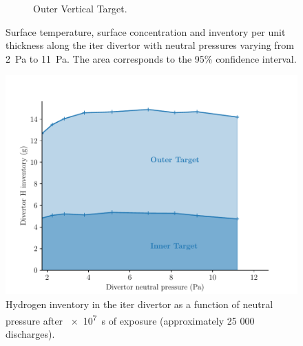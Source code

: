 \begin{figure}[h!]
\begin{subfigure}{0.58\linewidth}
        \caption{Outer Vertical Target.}
    \end{subfigure}
    \caption{Surface temperature, surface concentration and \gls{inventory} per unit thickness along the \gls{iter} \gls{divertor} with neutral pressures varying from \SI{2}{Pa} to \SI{11}{Pa}. The area corresponds to the 95\% confidence interval.}
\end{figure}


\begin{figure}[h]
    \centering
    \includegraphics[width=\linewidth]{Figures/Chapter4/ITER/inventory_vs_divertor_pressure.pdf}
    \caption{Hydrogen \gls{inventory} in the \gls{iter} \gls{divertor} as a function of neutral pressure after \SI{e7}{s} of exposure (approximately 25 000 discharges).}
\end{figure}


